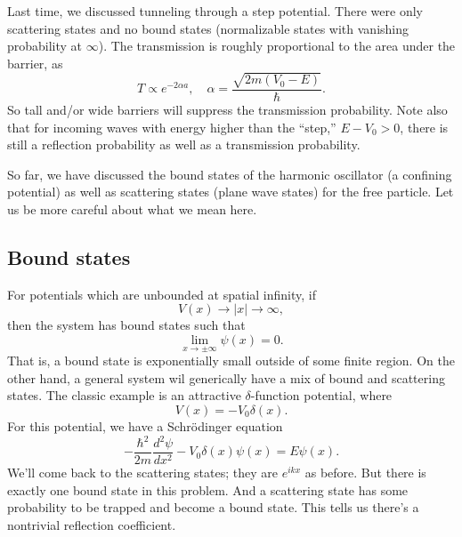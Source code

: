 Last time, we discussed tunneling through a step potential. There were only scattering states and no bound states (normalizable states with vanishing probability at $\infty$). The transmission is roughly proportional to the area under the barrier, as
\begin{equation}
    T\propto e^{-2\alpha a}, \quad \alpha =\frac{\sqrt{2m(V_0-E)}}{\hbar}.
\end{equation}
So tall and/or wide barriers will suppress the transmission probability. Note also that for incoming waves with energy higher than the ``step,'' $E-V_0>0$, there is still a reflection probability as well as a transmission probability.

So far, we have discussed the bound states of the harmonic oscillator (a confining potential) as well as scattering states (plane wave states) for the free particle. Let us be more careful about what we mean here.

\subsection*{Bound states}
For potentials which are unbounded at spatial infinity, if
\begin{equation}
    V(x)\to |x|\to \infty,
\end{equation}
then the system has bound states such that
\begin{equation}
    \lim_{x\to \pm\infty} \psi(x)=0.
\end{equation}
That is, a bound state is exponentially small outside of some finite region.
On the other hand, a general system wil generically have a mix of bound and scattering states. The classic example is an attractive $\delta$-function potential, where
\begin{equation}
    V(x) = -V_0 \delta(x).
\end{equation}
For this potential, we have a Schr\"odinger equation
\begin{equation}
    -\frac{\hbar^2}{2m}\frac{d^2\psi}{dx^2} - V_0 \delta(x) \psi(x) = E\psi(x).
\end{equation}
We'll come back to the scattering states; they are $e^{ikx}$ as before. But there is exactly one bound state in this problem. And a scattering state has some probability to be trapped and become a bound state. This tells us there's a nontrivial reflection coefficient.

